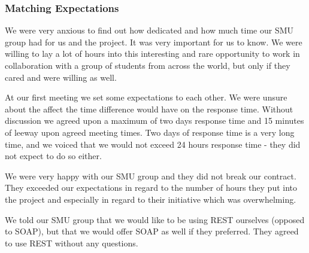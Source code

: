 \subsubsection{Matching Expectations}
We were very anxious to find out how dedicated and how much time our SMU group had for us and the project. It was very important for us to know. We were willing to lay a lot of hours into this interesting and rare opportunity to work in collaboration with a group of students from across the world, but only if they cared and were willing as well.

At our first meeting we set some expectations to each other. We were unsure about the affect the time difference would have on the response time. Without discussion we agreed upon a maximum of two days response time and 15 minutes of leeway upon agreed meeting times. Two days of response time is a very long time, and we voiced that we would not exceed 24 hours response time - they did not expect to do so either.

We were very happy with our SMU group and they did not break our contract. They exceeded our expectations in regard to the number of hours they put into the project and especially in regard to their initiative which was overwhelming. 

We told our SMU group that we would like to be using REST ourselves (opposed to SOAP), but that we would offer SOAP as well if they preferred. They agreed to use REST without any questions.